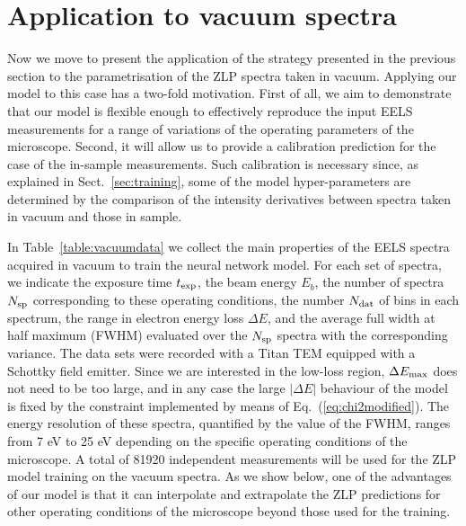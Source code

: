 \section{Application to vacuum spectra}
\label{sec:results_vacuum}

Now we move to present the application of the strategy presented in the previous
section to the parametrisation of the ZLP spectra taken in vacuum.
%
Applying our model to this case has a two-fold motivation.
%
First of all, we aim to demonstrate that our model is flexible enough to effectively reproduce the
input EELS measurements for a range of variations of the operating parameters of the microscope.
%
Second, it will allow us to provide a calibration prediction for the case of the in-sample measurements.
%
Such calibration is necessary since, as explained in Sect.~\ref{sec:training}, some of the model
hyper-parameters are determined by the comparison of the intensity derivatives
between spectra taken in vacuum and those in sample.

In Table~\ref{table:vacuumdata} we collect the main properties of the EELS spectra acquired in vacuum to train the neural
    network model.  For each set of spectra, we indicate the exposure time $t_{\rm exp}$, the beam energy
    $E_b$, the number of spectra $N_{\rm sp}$ corresponding to these operating conditions, the number $N_{\rm dat}$ of
    bins in each spectrum, the range in electron energy loss $\Delta E$,
    and the average full width at half maximum (FWHM)
    evaluated over the $N_{\rm sp}$ spectra with the corresponding variance.
    The data sets were recorded with a Titan TEM equipped with a Schottky field emitter.
    Since we are interested in the low-loss region, $\Delta E_{\rm max}$ does not need
    to be too large, and in any case the large $|\Delta E|$ behaviour of the model is fixed
    by the constraint implemented by means of Eq.~(\ref{eq:chi2modified}).
    The energy resolution of these spectra, quantified by the value of the FWHM, ranges
    from 7 eV to 25 eV depending on the specific operating conditions of the microscope.
    A total of 81920 independent measurements will be used for the ZLP model
    training on the vacuum spectra.
    As we show below, one of the advantages of our model is that it can interpolate and extrapolate the ZLP predictions
    for other operating conditions of the microscope beyond those used for the training.

